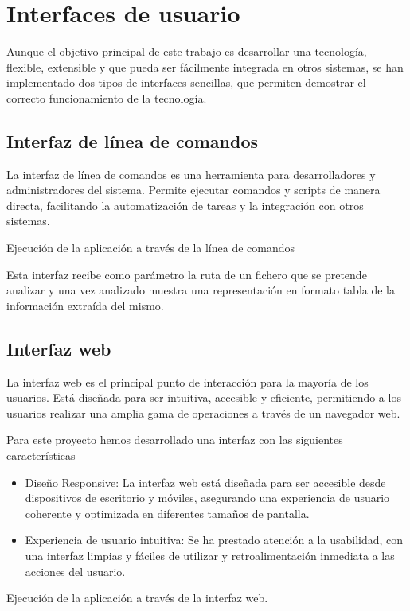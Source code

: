 \section{Interfaces de usuario}
Aunque el objetivo principal de este trabajo es desarrollar una tecnología, flexible, extensible y que pueda ser
fácilmente integrada en otros sistemas, se han implementado dos tipos de interfaces sencillas, que permiten demostrar el
correcto funcionamiento de la tecnología.

\subsection*{Interfaz de línea de comandos}
La interfaz de línea de comandos es una herramienta para desarrolladores y administradores del sistema. Permite ejecutar
comandos y scripts de manera directa, facilitando la automatización de tareas y la integración con otros sistemas.


Ejecución de la aplicación a través de la línea de comandos

Esta interfaz recibe como parámetro la ruta de un fichero que se pretende analizar y una vez analizado muestra una
representación en formato tabla de la información extraída del mismo.

\subsection*{Interfaz web}
La interfaz web es el principal punto de interacción para la mayoría de los usuarios. Está diseñada para ser intuitiva,
accesible y eficiente, permitiendo a los usuarios realizar una amplia gama de operaciones a través de un navegador web.

Para este proyecto hemos desarrollado una interfaz con las siguientes características

\begin{itemize}
    \item
    Diseño Responsive: La interfaz web está diseñada para ser accesible desde dispositivos de escritorio y móviles,
    asegurando una experiencia de usuario coherente y optimizada en diferentes tamaños de pantalla.
    \item
    Experiencia de usuario intuitiva: Se ha prestado atención a la usabilidad, con una interfaz limpias y fáciles de
    utilizar y retroalimentación inmediata a las acciones del usuario.
\end{itemize}


Ejecución de la aplicación a través de la interfaz web.

